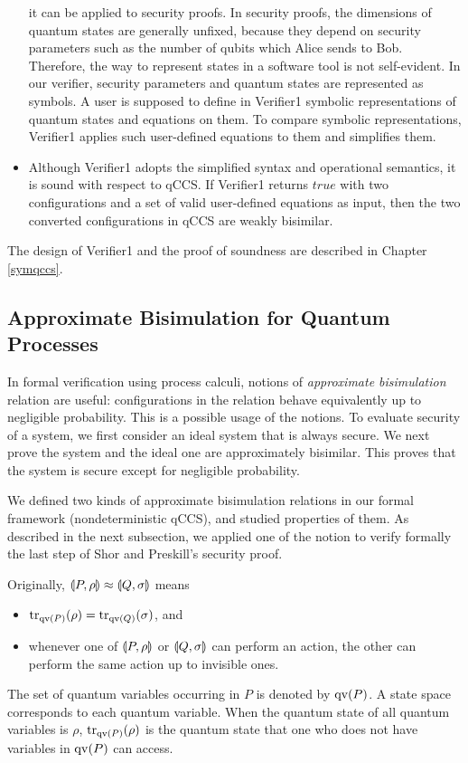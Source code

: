 \begin{itemize}
	it can be applied to security proofs.
	In security proofs,
	the dimensions of quantum states
	are generally unfixed, because they
	depend on security parameters such as the number of
	qubits which Alice sends to Bob. 
	Therefore, the way to represent states in
	a software tool is not self-evident.
	In our verifier, security parameters and quantum
	states are represented as symbols.
	A user is
	supposed to define in Verifier1 symbolic 
	representations of quantum states and 
	equations on them. To compare symbolic representations,
	Verifier1 applies such user-defined
	equations to them and simplifies them.
  \item Although Verifier1 adopts the simplified
	syntax and operational semantics, it is sound with respect
	to qCCS. If Verifier1 returns $\mathit{true}$
	with two configurations and a set of
	valid user-defined equations as input,
	then the two converted configurations
	in qCCS are weakly bisimilar.
 \end{itemize}
The design of Verifier1 and the proof of
soundness are described in Chapter \ref{symqccs}.

\subsection{Approximate Bisimulation for Quantum
Processes}
In formal verification using process calculi,
notions of {\it approximate bisimulation} relation are useful:
configurations in the relation behave equivalently up to
negligible probability. This is a possible usage of the notions.
To evaluate security of a system, we first consider an ideal
system that is always secure. We next prove the system and
the ideal one are approximately bisimilar. 
This proves that the system is secure except for
negligible probability.

We defined two kinds of approximate bisimulation relations
in our formal framework (nondeterministic qCCS),
and studied properties of them.
As described in the next subsection, we applied one of the notion
to verify formally the last step of Shor and Preskill's security proof.

Originally, $\llparenthesis P, \rho \rrparenthesis \approx \llparenthesis Q, \sigma \rrparenthesis$ means 
  \begin{itemize}
   \item ${\rm tr}_{\mathrm{qv}(P)}(\rho) = {\rm tr}_{\mathrm{qv}(Q)}(\sigma)$, and
   \item whenever one of $\llparenthesis P, \rho \rrparenthesis$ or $\llparenthesis Q, \sigma \rrparenthesis$
	 can perform an action,
	 the other can perform the same action up to invisible ones.
  \end{itemize}
The set of quantum variables occurring in $P$ 
is denoted by $\mathrm{qv}(P)$. A state space corresponds to each quantum variable.
When the quantum state of all quantum variables is $\rho$, 
${\rm tr}_{\mathrm{qv}(P)}(\rho)$ is the quantum state that one who does not have
variables in $\mathrm{qv}(P)$ can access.

